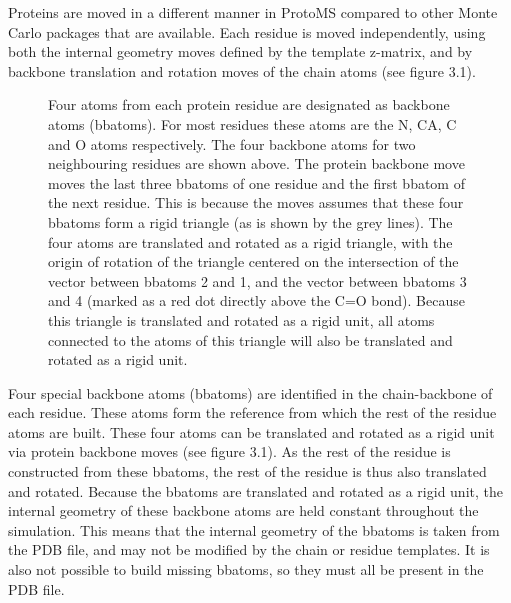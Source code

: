 \documentclass[letterpaper,10pt,english]{sphinxmanual}
\begin{document}
Proteins are moved in a different manner in ProtoMS compared to other Monte Carlo packages that are available. Each residue is moved independently, using both the internal geometry moves defined by the template z-matrix, and by backbone translation and rotation moves of the chain atoms (see figure 3.1).
\begin{figure}[htbp]
\centering
\capstart

\caption{Four atoms from each protein residue are designated as backbone atoms (bbatoms). For most residues these atoms are the N, CA, C and O atoms respectively. The four backbone atoms for two neighbouring residues are shown above. The protein backbone move moves the last three bbatoms of one residue and the first bbatom of the next residue. This is because the moves assumes that these four bbatoms form a rigid triangle (as is shown by the grey lines). The four atoms are translated and rotated as a rigid triangle, with the origin of rotation of the triangle centered on the intersection of the vector between bbatoms 2 and 1, and the vector between bbatoms 3 and 4 (marked as a red dot directly above the C=O bond). Because this triangle is translated and rotated as a rigid unit, all atoms connected to the atoms of this triangle will also be translated and rotated as a rigid unit.}\end{figure}

Four special backbone atoms (bbatoms) are identified in the chain-backbone of each residue. These atoms form the reference from which the rest of the residue atoms are built. These four atoms can be translated and rotated as a rigid unit via protein backbone moves (see figure 3.1). As the rest of the residue is constructed from these bbatoms, the rest of the residue is thus also translated and rotated. Because the bbatoms are translated and rotated as a rigid unit, the internal geometry of these backbone atoms are held constant throughout the simulation. This means that the internal geometry of the bbatoms is taken from the PDB file, and may not be modified by the chain or residue templates. It is also not possible to build missing bbatoms, so they must all be present in the PDB file.
\end{document}
